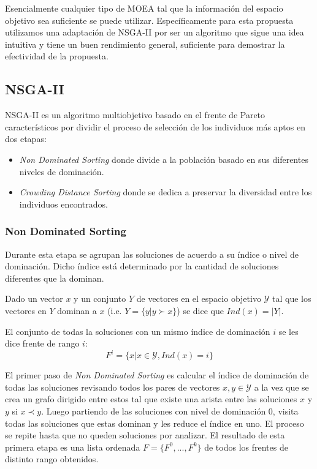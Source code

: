 Esencialmente cualquier tipo de MOEA tal que la informaci\'on del espacio objetivo sea suficiente se puede utilizar. Espec\'ificamente para esta propuesta utilizamos una adaptaci\'on de NSGA-II  por ser un algoritmo que sigue una idea intuitiva y tiene un buen rendimiento general, suficiente para demostrar la efectividad de la propuesta.

\subsection{NSGA-II}
NSGA-II  es un algoritmo multiobjetivo basado en el frente de Pareto caracter\'isticos por dividir el proceso de selecci\'on de los individuos m\'as aptos en dos etapas:
\begin{itemize}
    \item \textit{Non Dominated Sorting} donde divide a la poblaci\'on basado en sus diferentes niveles de dominaci\'on.
    \item \textit{Crowding Distance Sorting} donde se dedica a preservar la diversidad entre los individuos encontrados. 
\end{itemize}


\subsubsection{Non Dominated Sorting}
Durante esta etapa se agrupan las soluciones de acuerdo a su \'indice o nivel de dominaci\'on. Dicho \'indice est\'a  determinado por la cantidad de soluciones diferentes que la dominan.

\begin{definition}
    \label{proposal:def:domination_index}
    Dado un vector $x$ y un conjunto $Y$ de vectores en el espacio objetivo $\mathcal{Y}$ tal que los vectores en $Y$ dominan a $x$ (i.e. $Y = \{y | y \succ x\}$) se dice que $Ind(x) = |Y|$.
\end{definition}

\begin{definition}
    \label{proposal:def:rank_front}
    El conjunto de todas la soluciones con un mismo \'indice de dominaci\'on $i$ se les dice frente de rango $i$:
    \begin{equation*}
         F^i = \{x | x \in \mathcal{Y}, Ind(x) = i\}
    \end{equation*}
\end{definition}

El primer paso de \textit{Non Dominated Sorting} es calcular el \'indice de dominaci\'on de todas las soluciones revisando todos los pares de vectores $x, y \in \mathcal{Y}$ a la vez que se crea un grafo dirigido entre estos tal que existe una arista entre las soluciones $x$ y $y$ si $x \prec y$. Luego partiendo de las soluciones con nivel de dominaci\'on 0, visita todas las soluciones que estas dominan y les reduce el \'indice en uno. El proceso se repite hasta que no queden soluciones por analizar.
El resultado de esta primera etapa es una lista ordenada  $F = \{F^0, ..., F^k\}$ de todos los frentes de distinto rango obtenidos. 

